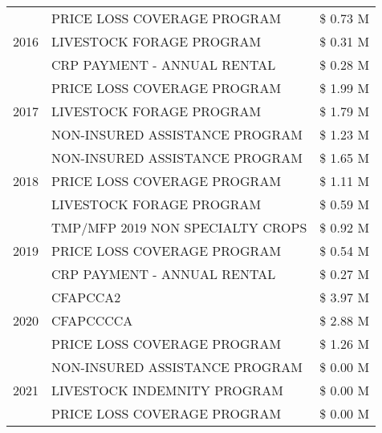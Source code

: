 \begin{tabular}{llr}
\cline{1-3}
\multirow[t]{3}{*}{2016} & PRICE LOSS COVERAGE PROGRAM & \$ 0.73 M \\
 & LIVESTOCK FORAGE PROGRAM & \$ 0.31 M \\
 & CRP PAYMENT - ANNUAL RENTAL & \$ 0.28 M \\
\cline{1-3}
\multirow[t]{3}{*}{2017} & PRICE LOSS COVERAGE PROGRAM & \$ 1.99 M \\
 & LIVESTOCK FORAGE PROGRAM & \$ 1.79 M \\
 & NON-INSURED ASSISTANCE PROGRAM & \$ 1.23 M \\
\cline{1-3}
\multirow[t]{3}{*}{2018} & NON-INSURED ASSISTANCE PROGRAM & \$ 1.65 M \\
 & PRICE LOSS COVERAGE PROGRAM & \$ 1.11 M \\
 & LIVESTOCK FORAGE PROGRAM & \$ 0.59 M \\
\cline{1-3}
\multirow[t]{3}{*}{2019} & TMP/MFP 2019 NON SPECIALTY CROPS & \$ 0.92 M \\
 & PRICE LOSS COVERAGE PROGRAM & \$ 0.54 M \\
 & CRP PAYMENT - ANNUAL RENTAL & \$ 0.27 M \\
\cline{1-3}
\multirow[t]{3}{*}{2020} & CFAPCCA2 & \$ 3.97 M \\
 & CFAPCCCCA & \$ 2.88 M \\
 & PRICE LOSS COVERAGE PROGRAM & \$ 1.26 M \\
\cline{1-3}
\multirow[t]{3}{*}{2021} & NON-INSURED ASSISTANCE PROGRAM & \$ 0.00 M \\
 & LIVESTOCK INDEMNITY PROGRAM & \$ 0.00 M \\
 & PRICE LOSS COVERAGE PROGRAM & \$ 0.00 M \\
\cline{1-3}
\bottomrule
\end{tabular}
